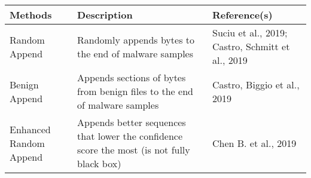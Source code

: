 \begin{tabularx}{1\textwidth} { 
  | >{\raggedright\arraybackslash}X 
  | >{\raggedright\arraybackslash}X
  | >{\raggedright\arraybackslash}X | }
 \hline
 Methods & Description & Reference(s) \\ [0.5ex] 
 \hline
 Random Append & Randomly appends bytes to the end of malware samples & Suciu et al., 2019; Castro, Schmitt et al., 2019 \\ 
 \hline
 Benign Append & Appends sections of bytes from benign files to the end of malware samples & Castro, Biggio et al., 2019 \\ 
 \hline
 Enhanced Random Append & Appends better sequences that lower the confidence score the most (is not fully black box) & Chen B. et al., 2019 \\ 
 \hline
\end{tabularx}